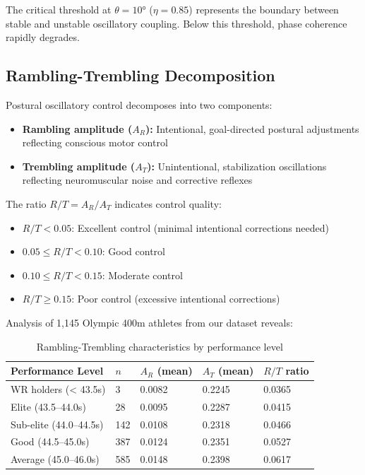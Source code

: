 The critical threshold at $\theta = 10°$ ($\eta = 0.85$) represents the boundary between stable and unstable oscillatory coupling. Below this threshold, phase coherence rapidly degrades.

\subsection{Rambling-Trembling Decomposition}

Postural oscillatory control decomposes into two components:

\begin{definition}
\begin{itemize}
    \item \textbf{Rambling amplitude ($A_R$):} Intentional, goal-directed postural adjustments reflecting conscious motor control
    \item \textbf{Trembling amplitude ($A_T$):} Unintentional, stabilization oscillations reflecting neuromuscular noise and corrective reflexes
\end{itemize}
\end{definition}

The ratio $R/T = A_R / A_T$ indicates control quality:
\begin{itemize}
    \item $R/T < 0.05$: Excellent control (minimal intentional corrections needed)
    \item $0.05 \leq R/T < 0.10$: Good control
    \item $0.10 \leq R/T < 0.15$: Moderate control
    \item $R/T \geq 0.15$: Poor control (excessive intentional corrections)
\end{itemize}

Analysis of 1,145 Olympic 400m athletes from our dataset reveals:

\begin{table}[H]
\centering
\caption{Rambling-Trembling characteristics by performance level}
\begin{tabular}{@{}lllll@{}}
\toprule
\textbf{Performance Level} & \textbf{$n$} & \textbf{$A_R$ (mean)} & \textbf{$A_T$ (mean)} & \textbf{$R/T$ ratio} \\
\midrule
WR holders (< 43.5s) & 3 & 0.0082 & 0.2245 & 0.0365 \\
Elite (43.5--44.0s) & 28 & 0.0095 & 0.2287 & 0.0415 \\
Sub-elite (44.0--44.5s) & 142 & 0.0108 & 0.2318 & 0.0466 \\
Good (44.5--45.0s) & 387 & 0.0124 & 0.2351 & 0.0527 \\
Average (45.0--46.0s) & 585 & 0.0148 & 0.2398 & 0.0617 \\
\bottomrule
\end{tabular}
\end{table}

